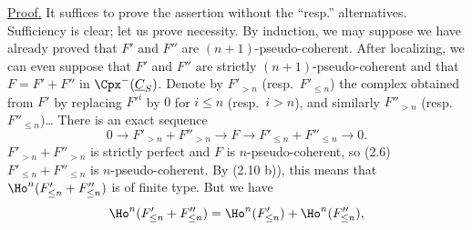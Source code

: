 \uline{Proof.} It suffices to prove the assertion without the ``resp.'' alternatives. Sufficiency is clear; let us prove necessity. By induction, we may suppose we have already proved that \(F'\) and \(F''\) are \((n+1)\)-pseudo-coherent. After localizing, we can even suppose that \(F'\) and \(F''\) are strictly \((n+1)\)-pseudo-coherent and that \(F=F'+F''\) in \(\Cpx^-(\underline{C}_S)\). Denote by \(F'_{>n}\) (resp.\ \(F'_{\leq n}\)) the complex obtained from \(F'\) by replacing \(F'^i\) by \(0\) for \(i\leq n\) (resp.\ \(i>n\)), and similarly \(F''_{>n}\) (resp.\ \(F''_{\leq n}\))\dots{} There is an exact sequence
\[
  0\longrightarrow F'_{>n}+F''_{>n}\longrightarrow F
  \longrightarrow F'_{\leq n}+F''_{\leq n}\longrightarrow 0 .
\]
\(F'_{>n}+F''_{>n}\) is strictly perfect and \(F\) is \(n\)-pseudo-coherent, so (2.6) \(F'_{\leq n}+F''_{\leq n}\) is \(n\)-pseudo-coherent. By (2.10 b)), this means that \(\Ho^n(F'_{\leq n}+F''_{\leq n})\) is of finite type. But we have
\[
  \Ho^n(F'_{\leq n}+F''_{\leq n})
  =\Ho^n(F'_{\leq n})+\Ho^n(F''_{\leq n}),
\]
